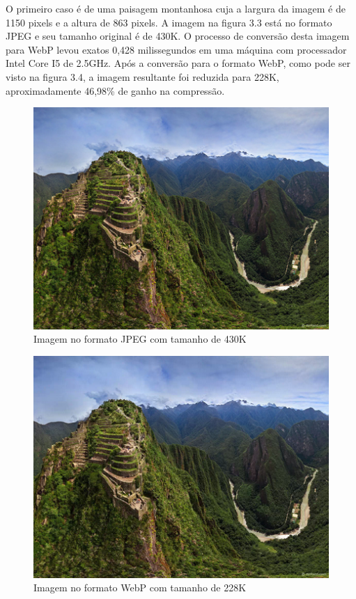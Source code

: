 \documentclass[espaco=simples,appendix=Name]{abnt}
\begin{document}
O primeiro caso é de uma paisagem montanhosa cuja a largura da imagem é de 1150 pixels e a altura de 863 pixels. A imagem na figura 3.3 está no formato JPEG e seu tamanho original é de 430K. O processo de conversão desta imagem para WebP levou exatos 0,428 milissegundos em uma máquina com processador Intel Core I5 de 2.5GHz. Após a conversão para o formato WebP, como pode ser visto na figura 3.4, a imagem resultante foi reduzida para 228K, aproximadamente 46,98\% de ganho na compressão.

\begin{figure}[h]
  \centering
    \includegraphics[scale=0.5]{Imagem1JPEG.png}
  \caption{Imagem no formato JPEG com tamanho de 430K}
\end{figure}

\begin{figure}[h]
  \centering
    \includegraphics[scale=0.5]{Imagem1WEBP.png}
  \caption{Imagem no formato WebP com tamanho de 228K}
\end{figure}
\end{document}

